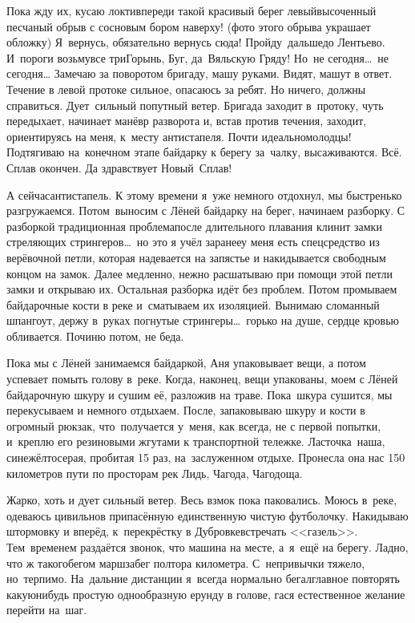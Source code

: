 Пока жду их, кусаю локти\mdash впереди такой красивый берег левый\mdash высоченный песчаный обрыв с сосновым бором наверху! (фото этого обрыва украшает обложку) Я~вернусь, обязательно вернусь сюда! Пройду~дальше\mdash до Лентьево. И~пороги возьму\mdash все три\mdash Горынь, Буг, да~Вяльскую Гряду! Но~не сегодня\ldots~не сегодня\ldots 
\newpage
Замечаю за поворотом бригаду, машу руками. Видят, машут в ответ. Течение в левой протоке сильное, опасаюсь за ребят. Но ничего, должны справиться. Дует~сильный попутный ветер. Бригада заходит в~протоку, чуть передыхает, начинает манёвр разворота и, встав против течения, заходит, ориентируясь на меня, к~месту антистапеля. Почти идеально\mdash  молодцы! Подтягиваю на~конечном этапе байдарку к берегу за~чалку, высаживаются. Всё. Сплав окончен. Да здравствует Новый~Сплав! 

А сейчас\mdash антистапель. К этому времени я~уже немного отдохнул, мы быстренько разгружаемся. Потом~выносим с Лёней байдарку на берег, начинаем разборку. С разборкой традиционная проблема\mdash после длительного плавания клинит замки стреляющих стрингеров\ldots~но это я учёл заранее\mdash у меня есть спецсредство из верёвочной петли, которая надевается на запястье и накидывается свободным концом на замок. Далее медленно, нежно расшатываю при помощи этой петли замки и открываю их. Остальная разборка идёт без проблем. Потом промываем байдарочные кости в реке и~сматываем их изоляцией. Вынимаю сломанный шпангоут, держу в~руках погнутые стрингеры\ldots~горько на душе, сердце кровью обливается. Починю потом, не беда. 

Пока мы с Лёней занимаемся байдаркой, Аня упаковывает вещи, а потом успевает помыть голову в~реке. Когда, наконец, вещи упакованы, моем с Лёней байдарочную шкуру и сушим её, разложив на траве. Пока~шкура сушится, мы перекусываем и немного отдыхаем. После, запаковываю шкуру и кости в огромный рюкзак, что~получается у~меня, как всегда, не с первой попытки, и~креплю его резиновыми жгутами к транспортной тележке. Ласточка~наша, сине\sdash жёлто\sdash серая, пробитая 15 раз, на~заслуженном отдыхе. Пронесла она нас 150 километров пути по просторам рек Лидь, Чагода, Чагодоща. 

Жарко, хоть и дует сильный ветер. Весь взмок пока паковались. Моюсь в~реке, одеваюсь цивильно\mdash в припасённую единственную чистую футболочку. Накидываю штормовку и вперёд, к~перекрёстку в Дубровке\mdash встречать <<газель>>. Тем~временем раздаётся звонок, что машина на месте, а~я~ещё на берегу. Ладно, что ж такого\mdash бегом марш\mdash забег полтора километра. С~непривычки тяжело, но~терпимо. На~дальние дистанции я~всегда нормально бегал\mdash главное повторять какую\sdash нибудь простую однообразную ерунду в голове, гася естественное желание перейти на~шаг. 

